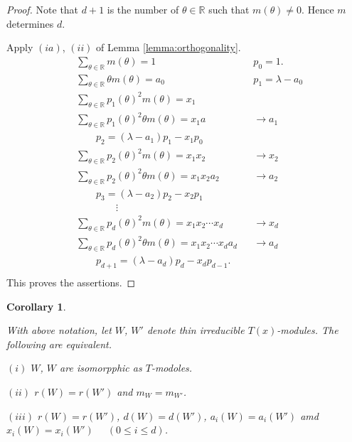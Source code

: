 \documentclass[
]{book}
\newtheorem{corollary}{Corollary}[chapter]
\theoremstyle{definition}
\theoremstyle{definition}
\theoremstyle{definition}
\theoremstyle{definition}
\theoremstyle{remark}
\begin{document}
\begin{proof}
Note that \(d+1\) is the number of \(\theta\in \mathbb{R}\) such that \(m(\theta)\neq 0\).
Hence \(m\) determines \(d\).

Apply \((ia)\), \((ii)\) of Lemma \ref{lemma:orthogonality}.
\begin{align}
& \sum_{\theta\in\mathbb{R}}m(\theta) = 1 && p_0 =1.\\
& \sum_{\theta\in\mathbb{R}}\theta m(\theta) = a_0 && p_1 = \lambda - a_0\\
& \sum_{\theta\in\mathbb{R}}p_1(\theta)^2 m(\theta) = x_1 \\
& \sum_{\theta\in\mathbb{R}}p_1(\theta)^2\theta m(\theta) = x_1a && \to a_1\\
& \qquad p_2 = (\lambda - a_1)p_1 - x_1p_0\\
& \sum_{\theta\in\mathbb{R}}p_2(\theta)^2 m(\theta) = x_1x_2 && \to x_2\\
& \sum_{\theta\in\mathbb{R}}p_2(\theta)^2\theta m(\theta) = x_1x_2a_2 && \to a_2\\
& \qquad p_3 = (\lambda-a_2)p_2 - x_2p_1\\
& \qquad\qquad \vdots\\
& \sum_{\theta\in\mathbb{R}}p_d(\theta)^2 m(\theta) = x_1x_2\cdots x_d && \to x_d\\
& \sum_{\theta\in\mathbb{R}}p_d(\theta)^2\theta m(\theta) = x_1x_2\cdots x_da_d && \to a_d\\
& \qquad p_{d+1} = (\lambda-a_d)p_d - x_dp_{d-1}.\\
\end{align}
This proves the assertions.
\end{proof}

\begin{corollary}
\protect\hypertarget{cor:isomorphic}{}\label{cor:isomorphic}

With above notation, let
\(W\), \(W'\) denote thin irreducible \(T(x)\)-modules. The following are equivalent.

\((i)\) \(W\), \(W\) are isomorpphic as \(T\)-modoles.

\((ii)\) \(r(W) = r(W')\) and \(m_W = m_{W'}\).

\((iii)\) \(r(W) = r(W')\), \(d(W) = d(W')\), \(a_i(W) = a_i(W')\) amd \(x_i(W) = x_i(W')\) \(\quad (0\leq i\leq d)\).

\end{corollary}
\end{document}
